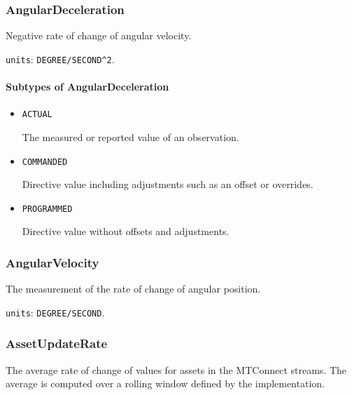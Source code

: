 \subsubsection{AngularDeceleration}
\label{sec:AngularDeceleration}



Negative rate of change of angular velocity.


\texttt{units}: \texttt{DEGREE/SECOND\^{}2}.

\paragraph{Subtypes of AngularDeceleration}\mbox{}
\label{sec:Subtypes of AngularDeceleration}

\begin{itemize}

\item \texttt{ACTUAL}


The measured or reported value of an \gls{observation}.

\item \texttt{COMMANDED}


Directive value including adjustments such as an offset or overrides.

\item \texttt{PROGRAMMED}


Directive value without offsets and adjustments.


\end{itemize}






\subsubsection{AngularVelocity}
\label{sec:AngularVelocity}



The measurement of the rate of change of angular position.


\texttt{units}: \texttt{DEGREE/SECOND}.


\subsubsection{AssetUpdateRate}
\label{sec:AssetUpdateRate}



The average rate of change of values for assets in the MTConnect streams. The average is computed over a rolling window defined by the implementation.



